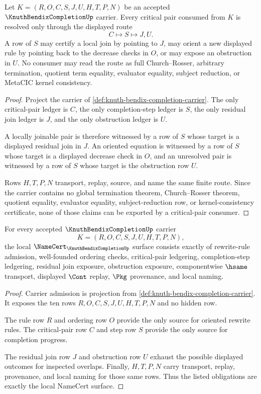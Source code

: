 \begin{theorem}
\label{thm:knuth-bendix-critical-pair-resolution}
Let $K=(R,O,C,S,J,U,H,T,P,N)$ be an accepted $\KnuthBendixCompletionUp$ carrier. Every critical pair consumed from $K$ is resolved only through the displayed route
$$
C \longmapsto S \longmapsto J,U .
$$
A row of $S$ may certify a local join by pointing to $J$, may orient a new displayed rule by pointing back to the decrease checks in $O$, or may expose an obstruction in $U$. No consumer may read the route as full Church--Rosser, arbitrary termination, quotient term equality, evaluator equality, subject reduction, or MetaCIC kernel consistency.
\end{theorem}
\begin{proof}
Project the carrier of \autoref{def:knuth-bendix-completion-carrier}. The only critical-pair ledger is $C$, the only completion-step ledger is $S$, the only residual join ledger is $J$, and the only obstruction ledger is $U$.

A locally joinable pair is therefore witnessed by a row of $S$ whose target is a displayed residual join in $J$. An oriented equation is witnessed by a row of $S$ whose target is a displayed decrease check in $O$, and an unresolved pair is witnessed by a row of $S$ whose target is the obstruction row $U$.

Rows $H,T,P,N$ transport, replay, source, and name the same finite route. Since the carrier contains no global termination theorem, Church--Rosser theorem, quotient equality, evaluator equality, subject-reduction row, or kernel-consistency certificate, none of those claims can be exported by a critical-pair consumer.
\end{proof}

\begin{theorem}
\label{thm:knuth-bendix-namecert-obligations}
For every accepted $\KnuthBendixCompletionUp$ carrier
$$
K=(R,O,C,S,J,U,H,T,P,N),
$$
the local $\NameCert_{\KnuthBendixCompletionUp}$ surface consists exactly of rewrite-rule admission, well-founded ordering checks, critical-pair ledgering, completion-step ledgering, residual join exposure, obstruction exposure, componentwise $\hsame$ transport, displayed $\Cont$ replay, $\Pkg$ provenance, and local naming.
\end{theorem}
\begin{proof}
Carrier admission is projection from \autoref{def:knuth-bendix-completion-carrier}. It exposes the ten rows $R,O,C,S,J,U,H,T,P,N$ and no hidden row.

The rule row $R$ and ordering row $O$ provide the only source for oriented rewrite rules. The critical-pair row $C$ and step row $S$ provide the only source for completion progress.

The residual join row $J$ and obstruction row $U$ exhaust the possible displayed outcomes for inspected overlaps. Finally, $H,T,P,N$ carry transport, replay, provenance, and local naming for those same rows. Thus the listed obligations are exactly the local NameCert surface.
\end{proof}

